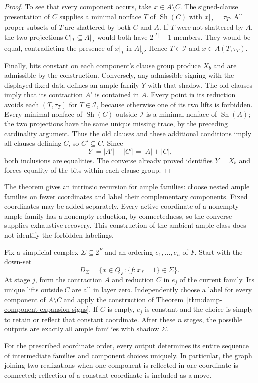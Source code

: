 \begin{proof}
To see that every component occurs, take $x\in A\setminus C$.
The signed-clause presentation of $C$ supplies a minimal nonface $T$ of
$\operatorname{Sh}(C)$ with $x|_T=\tau_T$.  All proper subsets of $T$
are shattered by both $C$ and $A$.  If $T$ were not shattered by $A$,
the two projections $C|_T\subseteq A|_T$ would both have
$2^{|T|}-1$ members.  They would be equal, contradicting the presence
of $x|_T$ in $A|_T$.  Hence $T\in\mathcal I$ and $x\in A(T,\tau_T)$.

Finally, bits constant on each component's clause group produce $X_b$
and are admissible by the construction.  Conversely, any admissible
signing with the displayed fixed data defines an ample family $Y$ with
that shadow.  The old clauses imply that its contraction $A'$ is
contained in $A$.  Every point in its reduction avoids each
$(T,\tau_T)$ for $T\in\mathcal I$, because otherwise one of its two
lifts is forbidden.  Every minimal nonface of $\operatorname{Sh}(C)$
outside $\mathcal I$ is a minimal nonface of $\operatorname{Sh}(A)$;
the two projections have the same unique missing trace, by the preceding
cardinality argument.  Thus the old clauses and these additional
conditions imply all clauses defining $C$, so $C'\subseteq C$.  Since
\[
 |Y|=|A'|+|C'|=|A|+|C|,
\]
both inclusions are equalities.  The converse already proved identifies
$Y=X_b$ and forces equality of the bits within each clause group.
\end{proof}

The theorem gives an intrinsic recursion for ample families: choose nested
ample families on fewer coordinates and label their complementary components.
Fixed coordinates may be added separately.  Every active coordinate of a
nonempty ample family has a nonempty reduction, by connectedness,
so the converse supplies exhaustive recovery.  This construction of the
ambient ample class does not identify the forbidden labelings.

\begin{corollary}
\label{cor:damp-component-reflection-generation}
Fix a simplicial complex $\Sigma\subseteq2^F$ and an ordering
$e_1,\ldots,e_n$ of $F$.  Start with the down-set
\[
 D_\Sigma=\{x\in Q_F:\{f:x_f=1\}\in\Sigma\}.
\]
At stage $j$, form the contraction $A$ and reduction $C$ in
$e_j$ of the current family.  Its unique lifts outside $C$ are all in
layer zero.  Independently choose a label for every component of
$A\setminus C$ and apply the construction of
Theorem~\ref{thm:damp-component-expansion-signs}.  If $C$ is empty,
$e_j$ is constant and the choice is simply to retain or reflect that
constant coordinate.  After these $n$ stages, the possible outputs are
exactly all ample families with shadow $\Sigma$.

For the prescribed coordinate order, every output determines its entire
sequence of intermediate families and component choices uniquely.  In
particular, the graph joining two realizations when one component is
reflected in one coordinate is connected; reflection of a constant
coordinate is included as a move.
\end{corollary}

